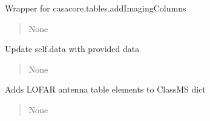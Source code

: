 \documentclass[letterpaper,10pt,english]{sphinxmanual}
\begin{document}
\begin{fulllineitems}
\begin{fulllineitems}
\label{\detokenize{api/killMS.Data:killMS.Data.ClassMS.ClassMS.PutCasaCols}}
\pysigstartsignatures
{}
\pysigstopsignatures
\sphinxAtStartPar
Wrapper for casacore.tables.addImagingColumns
\begin{quote}\begin{description}
\sphinxAtStartPar
None

\end{description}\end{quote}

\end{fulllineitems}


\begin{fulllineitems}
\label{\detokenize{api/killMS.Data:killMS.Data.ClassMS.ClassMS.PutColInData}}
\pysigstartsignatures
{}
\pysigstopsignatures
\sphinxAtStartPar
Update self.data with provided data
\begin{quote}\begin{description}
\sphinxAtStartPar
None

\end{description}\end{quote}

\end{fulllineitems}


\begin{fulllineitems}
\label{\detokenize{api/killMS.Data:killMS.Data.ClassMS.ClassMS.PutLOFARKeys}}
\pysigstartsignatures
{}
\pysigstopsignatures
\sphinxAtStartPar
Adds LOFAR antenna table elements to ClassMS dict
\begin{quote}\begin{description}
\sphinxAtStartPar
None

\end{description}\end{quote}


\end{fulllineitems}
\end{fulllineitems}
\end{document}
